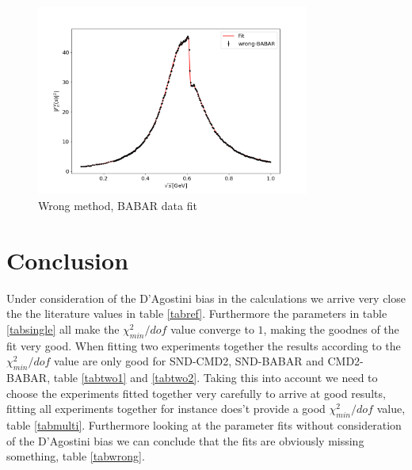 \documentclass[a4paper]{article}
\begin{document}
\begin{figure}[H]
    \centering
    \includegraphics[width=0.8\textwidth]{./plots/wrong-BABAR.png}
    \caption{Wrong method, BABAR data fit\label{fig15}}
\end{figure}

\section{Conclusion}
Under consideration of the D'Agostini bias in the calculations we arrive very close the the literature values in table \ref{tabref}.
Furthermore the parameters in table \ref{tabsingle} all make the $\chi^2_{min}/dof$ value converge to $1$, making the goodnes of the fit very
good. When fitting two experiments together the results according to the $\chi^2_{min}/dof$ value are only good for SND-CMD2, SND-BABAR
and CMD2-BABAR, table \ref{tabtwo1} and \ref{tabtwo2}. Taking this into account we need to choose the experiments fitted together very
carefully to arrive at good results, fitting all experiments together for instance does't provide a good  $\chi^2_{min}/dof$ value, table
\ref{tabmulti}. Furthermore looking at the parameter fits without consideration of the D'Agostini bias we can conclude that the fits are
obviously missing something, table \ref{tabwrong}.

\printbibliography
\end{document}
